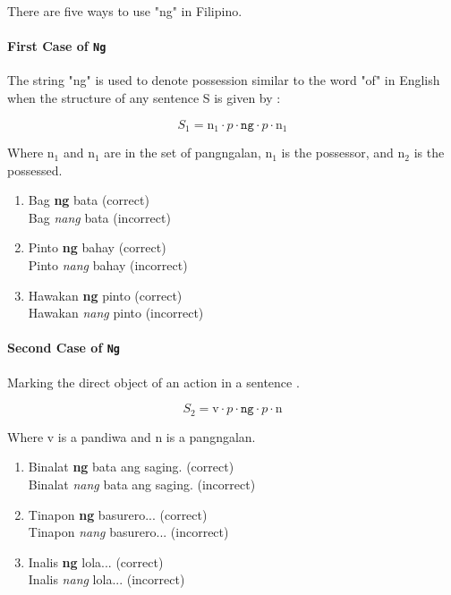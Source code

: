 \noindent There are five ways to use "ng" in Filipino.

\paragraph{First Case of \texttt{Ng}} The string "ng" is used to denote possession similar to the word "of" in English when the structure of any sentence S is given by \cite{KWF}:

\[
      S_1 = \text{n}_1 \cdot p \cdot \texttt{ng} \cdot p \cdot \text{n}_1
\]

Where n$_1$ and n$_1$ are in the set of pangngalan,  n$_1$ is the possessor, and n$_2$ is the possessed.

\begin{example}
\end{example}

\begin{enumerate}
      \item Bag \textbf{ng} bata (correct)
            \\ Bag \textit{nang} bata (incorrect)
      \item Pinto \textbf{ng} bahay (correct)
            \\ Pinto \textit{nang} bahay (incorrect)
      \item Hawakan \textbf{ng} pinto (correct)
            \\ Hawakan \textit{nang} pinto (incorrect)
\end{enumerate}

\paragraph{Second Case of \texttt{Ng}} Marking the direct object of an action in a sentence \cite{KWF}.

\[
      S_2 = \text{v} \cdot p \cdot \texttt{ng} \cdot p \cdot \text{n}
\]

Where v is a pandiwa and n is a pangngalan.

\begin{example}
\end{example}

\begin{enumerate}
      \item Binalat \textbf{ng} bata ang saging. (correct)
            \\ Binalat \textit{nang} bata ang saging. (incorrect)
      \item Tinapon \textbf{ng} basurero... (correct)
            \\ Tinapon \textit{nang} basurero... (incorrect)
      \item Inalis \textbf{ng} lola... (correct)
            \\ Inalis \textit{nang} lola... (incorrect)
\end{enumerate}

